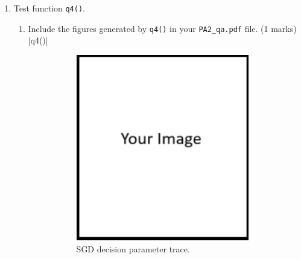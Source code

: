 \documentclass{article}
\theoremstyle{definition}
\newtheorem*{answer}{Answer}
\begin{document}
\begin{enumerate}[label=\ref{partsgd}.\alph*]
\begin{enumerate}[label=1.2.c.\roman*]
\begin{figure}[h]
\begin{subfigure}[t]{0.5\textwidth}
					\caption{SGD Loss vs. iteration.}
				\end{subfigure}
				\caption{Figures generated by .}
			\end{figure}
		\item In 1-2 sentences describe the behavior of SGD in \verb|q3()| when $\eta=0.001, 0.005$, and $0.01$. Explain why SGD fails to find the global optimum point? (1 marks)
		\begin{answer}
			Your answer ...
		\end{answer}
		\item In 1-2 sentences describe the behavior of SGD in \verb|q3()| when $\eta=0.05$. (1 marks)
		\begin{answer}
			Your answer ...
		\end{answer}
	\end{enumerate}
	\newpage
	\item Test function \verb|q4()|.
	\begin{enumerate}[label=1.2.d.\roman*]
		\item Include the figures generated by \verb|q4()| in your \verb|PA2_qa.pdf| file. (1 marks)
		|q4()|
		\begin{figure}[h]
			\centering
			\begin{subfigure}[t]{0.5\textwidth}
				\centering
				\includegraphics[height=3.2in]{image.png}
				\caption{SGD decision parameter trace.}
			\end{subfigure}%
			~ 
			\begin{subfigure}[t]{0.5\textwidth}
				\centering

\end{subfigure}
\end{figure}
\end{enumerate}
\end{enumerate}
\end{document}
